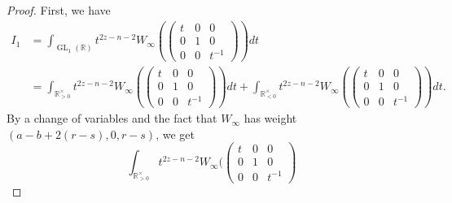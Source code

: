 \documentclass[11pt, a4paper]{amsart}
\theoremstyle{plain}
\theoremstyle{definition}
\numberwithin{equation}{section}
\def\RR{\mathbb{R}}
\DeclareMathOperator{\GL}{\mathrm{GL}}
\begin{document}
\begin{proof}
    First, we have 
            \begin{align*}
                I_1 &= \int_{\GL_1(\RR)} t^{2z - n - 2} W_{\infty}( \begin{pmatrix}
                                                                        t & 0 & 0 \\
                                                                        0 & 1 & 0 \\
                                                                        0 & 0 & t^{-1} 
                                                                      \end{pmatrix}) dt \\
                    &= \int_{\RR^{\times}_{>0}} t^{2z - n - 2} W_{\infty}( \begin{pmatrix}
                                                                        t & 0 & 0 \\
                                                                        0 & 1 & 0 \\
                                                                        0 & 0 & t^{-1} 
                                                                      \end{pmatrix}) dt + \int_{\RR^{\times}_{<0}} t^{2z - n - 2} W_{\infty}( \begin{pmatrix}
                                                                        t & 0 & 0 \\
                                                                        0 & 1 & 0 \\
                                                                        0 & 0 & t^{-1} 
                                                                      \end{pmatrix}) dt. 
            \end{align*}
        By a change of variables and the fact that $W_{\infty}$ has weight $(a - b + 2(r - s), 0, r-s)$, we get 
        \begin{equation*}
            \int_{\RR^{\times}_{>0}} t^{2z - n - 2} W_{\infty}( \begin{pmatrix}
                                                                        t & 0 & 0 \\
                                                                        0 & 1 & 0 \\
                                                                        0 & 0 & t^{-1} 

\end{pmatrix}
\end{equation*}
\end{proof}
\end{document}

